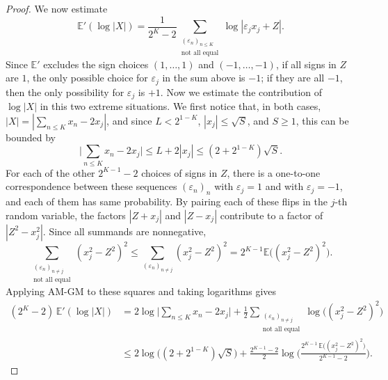 \documentclass[reqno,12pt]{amsart}
\theoremstyle{remark}
\newcommand{\EE}{\mathbb{E}}
\begin{document}
\begin{proof}
We now estimate 
$$\EE'(\log|X|)=\frac{1}{2^K-2}\sum_{\substack{(\varepsilon_n)_{n\leq K}\\ \text{not all equal}}} \log|\varepsilon_jx_j+Z|.$$ 
Since $\EE'$ excludes the sign choices $(1,\ldots,1)$ and $(-1,\ldots,-1)$, if all signs in $Z$ are $1$, the only possible choice for $\varepsilon_j$ in the sum above is $-1$; if they are all $-1$, then the only possibility for $\varepsilon_j$ is $+1$. Now we estimate the contribution of $\log |X|$ in this two extreme situations. We first notice that, in both cases,  $|X|=|\sum_{n\leq K} x_n-2x_j|$, and since $L<2^{1-K}$, $|x_j|\leq\sqrt{S}$, and $S\geq1$, this can be bounded by
$$ \bigg|\sum_{n\leq K} x_n-2x_j\bigg|\leq L+2|x_j|\leq(2+2^{1-K})\sqrt{S}. $$
For each of the other $2^{K-1}-2$ choices of signs in $Z$, there is a one-to-one correspondence between these sequences $(\varepsilon_n)_{n}$ with $\varepsilon_j=1$ and with $\varepsilon_j=-1$, and each of them has same probability. By pairing each of these flips in the $j$-th random variable, the factors $|Z+x_j|$ and $|Z-x_j|$ contribute to a factor of $|Z^2-x_j^2|$. Since all summands are nonnegative,
$$ \sum_{\substack{(\varepsilon_n)_{n\neq j}\\ \text{not all equal}}}(x_j^2-Z^2)^2
\leq\sum_{(\varepsilon_n)_{n\neq j}}(x_j^2-Z^2)^2
=2^{K-1}\EE\big((x_j^2-Z^2)^2\big). $$
Applying AM-GM to these squares and taking logarithms gives
\begin{align}
(2^K-2)\,\EE'(\log|X|) &=2\log\bigg|\sum_{n\leq K} x_n-2x_j\bigg| +\frac{1}{2}\sum_{\substack{(\varepsilon_n)_{n\neq j}\\ \text{not all equal}}} \log\big((x_j^2-Z^2)^2\big) \nonumber \\
&\leq 2\log\big((2+2^{1-K})\sqrt{S}\big) +\frac{2^{K-1}-2}{2} \log\bigg(\frac{2^{K-1}\,\EE\big((x_j^2-Z^2)^2\big)}{2^{K-1}-2}\bigg). \label{equation moment bound}
\end{align}


\end{proof}
\end{document}
